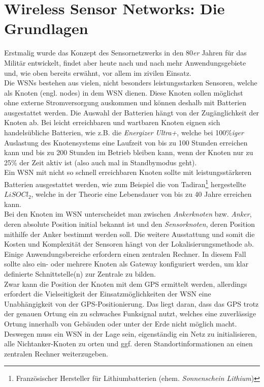 \documentclass[12pt, a4wide]{scrreprt}
\begin{document}
\chapter{Wireless Sensor Networks: Die Grundlagen}
Erstmalig wurde das Konzept des Sensornetzwerks in den 80\textit{er} Jahren für das Militär entwickelt, findet aber heute nach und nach mehr Anwendungsgebiete und, wie oben bereits erwähnt, vor allem im zivilen Einsatz.\\
\indent
Die WSNs bestehen aus vielen, nicht besonders leistungsstarken Sensoren, welche als Knoten (engl. nodes) in dem WSN dienen.
Diese Knoten sollen möglichst ohne externe Stromversorgung auskommen und können deshalb mit Batterien ausgestattet werden. Die Auswahl der Batterien hängt von der Zugänglichkeit der Knoten ab. Bei leicht erreichbaren und wartbaren Knoten eignen sich handelsübliche Batterien, wie z.B. die \textit{Energizer Ultra+}, welche bei 100\%\textit{iger} Auslastung des Knotensystems eine Laufzeit von bis zu 100 Stunden erreichen kann und bis zu 200 Stunden im Betrieb bleiben kann, wenn der Knoten nur zu 25\% der Zeit aktiv ist (also auch mal in Standbymodus geht)\cite{lifetime_study}.\\
\indent
Ein WSN mit nicht so schnell erreichbaren Knoten sollte mit leistungsstärkeren Batterien ausgestattet werden, wie zum Beispiel die von Tadiran\footnote{Französischer Hersteller für Lithiumbatterien (ehem. \textit{Sonnenschein Lithium})} hergestellte $LiSOCl_2$, welche in der Theorie eine Lebensdauer von bis zu 40 Jahre erreichen kann.\\
\indent
Bei den Knoten im WSN unterscheidet man zwischen \textit{Ankerknoten} bzw. \textit{Anker}, deren absolute Position initial bekannt ist und den \textit{Sensorknoten}, deren Position mithilfe der Anker bestimmt werden soll. 
Die weitere Ausstattung und somit die Kosten und Komplexität der Sensoren hängt von der Lokalisierungsmethode ab.\\
\indent
Einige Anwendungsbereiche erfordern einen zentralen Rechner. In diesem Fall sollte also ein- oder mehrere Knoten als Gateway konfiguriert werden, um klar definierte Schnittstelle(n) zur Zentrale zu bilden.\\
\indent
Zwar kann die Position der Knoten mit dem GPS ermittelt werden, allerdings erfordert die Vielseitigkeit der Einsatzmöglichkeiten der WSN eine Unabhängigkeit von der GPS-Positionierung. Das liegt daran, dass das GPS trotz der genauen Ortung ein zu schwaches Funksignal nutzt, welches eine zuverlässige  Ortung innerhalb von Gebäuden oder unter der Erde nicht möglich macht. Deswegen muss ein WSN in der Lage sein, eigenständig ein Netz zu initialisieren, alle Nichtanker-Knoten zu orten und ggf. deren Standortinformationen an einen zentralen Rechner weiterzugeben.
\end{document}
